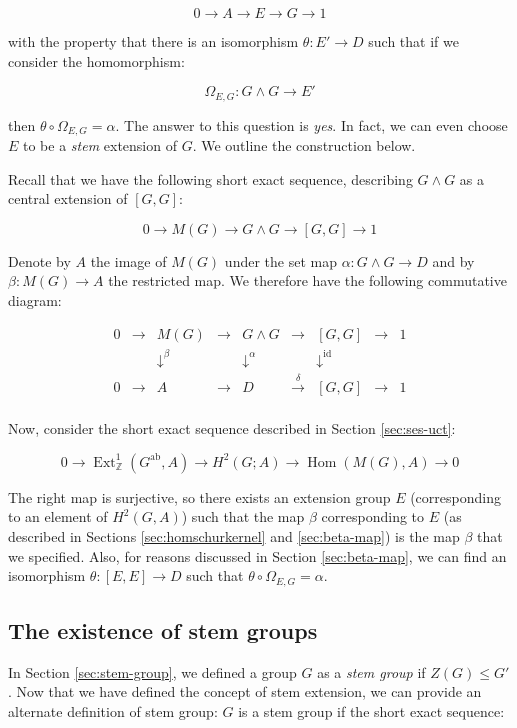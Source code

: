 \documentclass{ucetd}
\begin{document}
$$0 \to A \to E \to G \to 1$$

with the property that there is an isomorphism $\theta:E' \to D$ such
that if we consider the homomorphism:

$$\Omega_{E,G}: G \wedge G \to E'$$

then $\theta \circ \Omega_{E,G} = \alpha$. The answer to this question is
{\em yes}. In fact, we can even choose $E$ to be a {\em stem}
extension of $G$. We outline the construction below.

Recall that we have the following short exact sequence, describing $G
\wedge G$ as a central extension of $[G,G]$:

$$0 \to M(G) \to G \wedge G \to [G,G] \to 1$$

Denote by $A$ the image of $M(G)$ under the set map $\alpha:G \wedge G
\to D$ and by $\beta:M(G) \to A$ the restricted map. We therefore
have the following commutative diagram:

$$\begin{array}{ccccccccc}
  0 & \to & M(G) & \to & G \wedge G & \to & [G,G] & \to & 1\\
  &&   \downarrow^{\beta}  &&  \downarrow^{\alpha}     && \downarrow^{\text{id}} && \\
  0 & \to & A &\to & D & \stackrel{\delta}{\to} & [G,G] & \to & 1\\
\end{array}$$

Now, consider the short exact sequence described in Section
\ref{sec:ses-uct}:

$$0 \to \operatorname{Ext}^1_{\mathbb{Z}}(G^{\operatorname{ab}},A) \to H^2(G;A) \to \operatorname{Hom}(M(G),A) \to 0$$

The right map is surjective, so there exists an extension group $E$
(corresponding to an element of $H^2(G,A)$) such that the map $\beta$
corresponding to $E$ (as described in Sections
\ref{sec:homschurkernel} and \ref{sec:beta-map}) is the map $\beta$
that we specified. Also, for reasons discussed in Section
\ref{sec:beta-map}, we can find an isomorphism $\theta:[E,E] \to D$
such that $\theta \circ \Omega_{E,G} = \alpha$.

\subsection{The existence of stem groups}\label{sec:stem-group-existence}

In Section \ref{sec:stem-group}, we defined a group $G$ as a {\em stem
  group} if $Z(G) \le G'$. Now that we have defined the concept of
stem extension, we can provide an alternate definition of stem group:
$G$ is a stem group if the short exact sequence:
\end{document}
